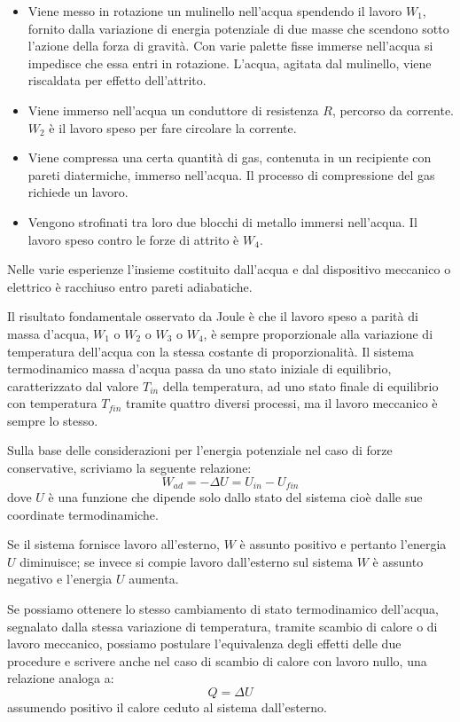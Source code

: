 \documentclass[class=book, crop=false, oneside, 12pt]{standalone}
\begin{document}
\begin{itemize}
    \item Viene messo in rotazione un mulinello nell'acqua spendendo il lavoro \(W_1\), fornito dalla variazione di energia potenziale di due masse che scendono sotto l'azione della forza di gravità. 
    Con varie palette fisse immerse nell'acqua si impedisce che essa entri in rotazione. 
    L'acqua, agitata dal mulinello, viene riscaldata per effetto dell'attrito. 
    \item Viene immerso nell'acqua un conduttore di resistenza \(R\), percorso da corrente. 
    \(W_2\) è il lavoro speso per fare circolare la corrente.
    \item Viene compressa una certa quantità di gas, contenuta in un recipiente con pareti diatermiche, immerso nell'acqua. 
    Il processo di compressione del gas richiede un lavoro.
    \item Vengono strofinati tra loro due blocchi di metallo immersi nell'acqua.  
    Il lavoro speso contro le forze di attrito è \(W_4\).
\end{itemize}
Nelle varie esperienze l'insieme costituito dall'acqua e dal dispositivo meccanico o elettrico è racchiuso entro pareti adiabatiche. 

Il risultato fondamentale osservato da Joule è che il lavoro speso a parità di massa d'acqua, \(W_1\) o \(W_2\) o \(W_3\) o \(W_4\), è sempre proporzionale alla variazione di temperatura dell'acqua con la stessa costante di proporzionalità.\newline
Il sistema termodinamico massa d'acqua passa da uno stato iniziale di equilibrio, caratterizzato dal valore \(T_{in}\) della temperatura, ad uno stato finale di equilibrio con temperatura \(T_{fin}\) tramite quattro diversi processi, ma il lavoro meccanico è sempre lo stesso.

Sulla base delle considerazioni per l'energia potenziale nel caso di forze conservative, scriviamo la seguente relazione:
\begin{equation}
    W_{ad} = - \Delta U = U_{in} - U_{fin}    
\end{equation}
dove \(U\) è una funzione che dipende solo dallo stato del sistema cioè dalle sue coordinate termodinamiche.

Se il sistema fornisce lavoro all'esterno, \(W\) è assunto positivo e pertanto l'energia \(U\) diminuisce; se invece si compie lavoro dall'esterno sul sistema \(W\) è assunto negativo e l'energia \(U\) aumenta.

Se possiamo ottenere lo stesso cambiamento di stato termodinamico dell'acqua, segnalato dalla stessa variazione di temperatura, tramite scambio di calore o di lavoro meccanico, possiamo postulare l'equivalenza degli effetti delle due procedure e scrivere anche nel caso di scambio di calore con lavoro nullo, una relazione analoga a:
\begin{equation}
    Q = \Delta U
\end{equation}
assumendo positivo il calore ceduto al sistema dall'esterno. 
\end{document}
